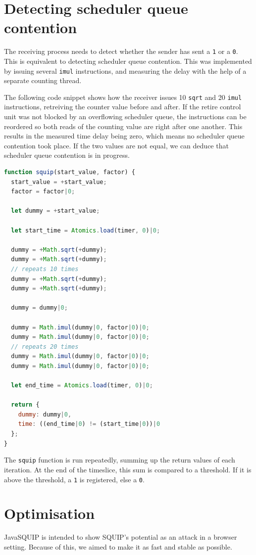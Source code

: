 \documentclass[11pt,
  titlepage=false,
]{scrreprt}
\begin{document}
\section{Detecting scheduler queue contention}
\label{sec:detect-sqc}
The receiving process needs to detect whether the sender has sent a \texttt{1} or a \texttt{0}.
This is equivalent to detecting scheduler queue contention.
This was implemented by issuing several \texttt{imul} instructions,
and measuring the delay with the help of a separate counting thread.

The following code snippet shows how the receiver issues 10 \texttt{sqrt} and 20 \texttt{imul} instructions,
retreiving the counter value before and after.
If the retire control unit was not blocked by an overflowing scheduler queue,
the instructions can be reordered so both reads of the counting value are right after one another.
This results in the measured time delay being zero, which means no scheduler queue contention took place.
If the two values are not equal, we can deduce that scheduler queue contention is in progress.

\begin{lstlisting}[language=JavaScript]
function squip(start_value, factor) {
  start_value = +start_value;
  factor = factor|0;

  let dummy = +start_value;

  let start_time = Atomics.load(timer, 0)|0;

  dummy = +Math.sqrt(+dummy);
  dummy = +Math.sqrt(+dummy);
  // repeats 10 times
  dummy = +Math.sqrt(+dummy);
  dummy = +Math.sqrt(+dummy);

  dummy = dummy|0;

  dummy = Math.imul(dummy|0, factor|0)|0;
  dummy = Math.imul(dummy|0, factor|0)|0;
  // repeats 20 times
  dummy = Math.imul(dummy|0, factor|0)|0;
  dummy = Math.imul(dummy|0, factor|0)|0;

  let end_time = Atomics.load(timer, 0)|0;

  return {
    dummy: dummy|0,
    time: ((end_time|0) != (start_time|0))|0
  };
}
\end{lstlisting}

The \texttt{squip} function is run repeatedly, summing up the return values of each iteration.
At the end of the timeslice, this sum is compared to a threshold.
If it is above the threshold, a \texttt{1} is registered, else a \texttt{0}.

\section{Optimisation}
JavaSQUIP is intended to show SQUIP's potential as an attack in a browser setting.
Because of this, we aimed to make it as fast and stable as possible.
\end{document}
